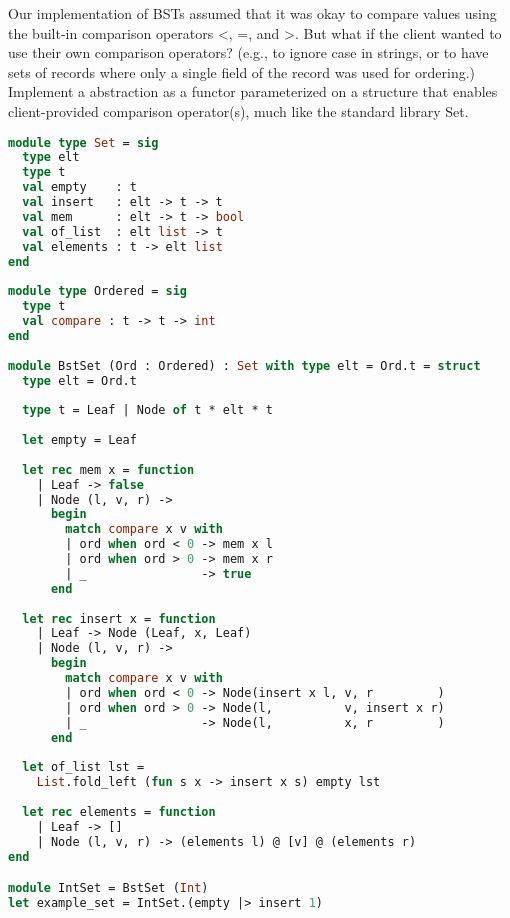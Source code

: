 Our implementation of BSTs assumed that it was okay to compare values using the built-in comparison operators <, =,
and >. But what if the client wanted to use their own comparison operators? (e.g., to ignore case in strings, or to have sets
of records where only a single field of the record was used for ordering.) Implement a  abstraction as a functor
parameterized on a structure that enables client-provided comparison operator(s), much like the standard library Set.

\begin{lstlisting}[language=OCaml]
module type Set = sig
  type elt
  type t
  val empty    : t
  val insert   : elt -> t -> t
  val mem      : elt -> t -> bool
  val of_list  : elt list -> t
  val elements : t -> elt list
end
 
module type Ordered = sig
  type t
  val compare : t -> t -> int
end
 
module BstSet (Ord : Ordered) : Set with type elt = Ord.t = struct
  type elt = Ord.t
 
  type t = Leaf | Node of t * elt * t
 
  let empty = Leaf
 
  let rec mem x = function
    | Leaf -> false
    | Node (l, v, r) ->
      begin
        match compare x v with
        | ord when ord < 0 -> mem x l
        | ord when ord > 0 -> mem x r
        | _                -> true
      end
 
  let rec insert x = function
    | Leaf -> Node (Leaf, x, Leaf)
    | Node (l, v, r) ->
      begin
        match compare x v with
        | ord when ord < 0 -> Node(insert x l, v, r         )
        | ord when ord > 0 -> Node(l,          v, insert x r)
        | _                -> Node(l,          x, r         )
      end
 
  let of_list lst =
    List.fold_left (fun s x -> insert x s) empty lst
 
  let rec elements = function
    | Leaf -> []
    | Node (l, v, r) -> (elements l) @ [v] @ (elements r)
end

module IntSet = BstSet (Int)
let example_set = IntSet.(empty |> insert 1)
\end{lstlisting}


